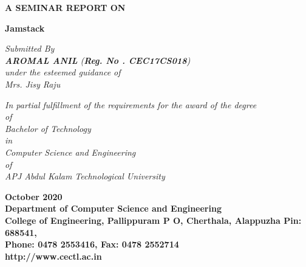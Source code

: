 \documentclass[12pt,a4paper,oneside]{report}
\begin{document}
\begin{titlepage}
\begin{center}

\large{\textbf{A SEMINAR REPORT ON}}\\
\begin{singlespace}
\LARGE{\textbf{Jamstack}}\\
\end{singlespace}


\Large{\textit{Submitted By }}\\
\Large{\textit{\textbf{AROMAL ANIL}     (\textbf{Reg. No . CEC17CS018})}}\\
\Large{\textit{\textit{under the esteemed guidance of}}}\\
\Large{\textit{Mrs. Jisy Raju}}\\
\begin{singlespace}
\large{\textit{In partial fulfillment of the requirements for the award of the degree}\\
\large{ \textit{of}}\\
\large{\textit{Bachelor of Technology} }\\
\large{\textit{in}}\\
\large{\textit{Computer Science and Engineering}}\\
\large{\textit{of}}\\
\large{\textit{APJ Abdul Kalam Technological University}}}\\
\end{singlespace}
\begin{figure}[h]
\begin{center}
\end{center}
\end{figure}
\begin{singlespace}

\Large{\textbf{October 2020\\Department of Computer Science and Engineering\\College of Engineering, Pallippuram P O, Cherthala, Alappuzha Pin: 688541, \\Phone: 0478 2553416, Fax: 0478 2552714\\http://www.cectl.ac.in}}
\end{singlespace}
\end{center}
\end{titlepage}
\end{document}
